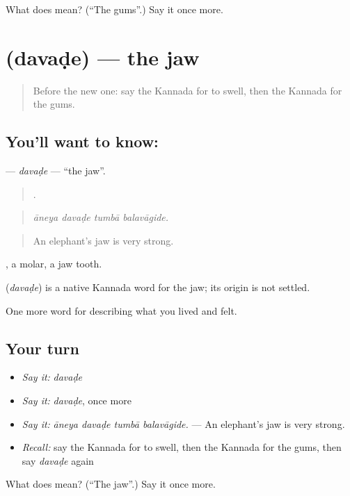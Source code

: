 \begin{tcolorbox}[breakable,colback=teal!4,colframe=teal!35!black,title={Before you move on}]
What does  mean? (\textquotedblleft{}The gums\textquotedblright{}.) Say it once more.
\end{tcolorbox}
\section[\texorpdfstring{\kn{ದವಡೆ} (davaḍe)}{ದವಡೆ (davaḍe)}]{ (davaḍe) — the jaw}

\label{lesson:KA-C510-davade}



\begin{quote}
Before the new one: say the Kannada for to swell, then the Kannada for the gums.
\end{quote}

\subsection*{You'll want to know: }
\textbf{} — \emph{davaḍe} — \textquotedblleft{}the jaw\textquotedblright{}.

\begin{quote}
   .
\end{quote}

\begin{quote}
\emph{āneya davaḍe tumbā balavāgide.}
\end{quote}

\begin{quote}
An elephant's jaw is very strong.
\end{quote}

 , a molar, a jaw tooth.

\begin{cousinweb}
\textbf{} (\emph{davaḍe}) is a native Kannada word for the jaw; its origin is not settled.
\end{cousinweb}

\begin{grammarlens}[title={What you've built}]
One more word for describing what you lived and felt.
\end{grammarlens}

\subsection*{Your turn}
\begin{itemize}
\raggedright
  \item \emph{Say it:} \emph{davaḍe}
  \item \emph{Say it:} \emph{davaḍe}, once more
  \item \emph{Say it:} \emph{āneya davaḍe tumbā balavāgide.} — An elephant's jaw is very strong.
  \item \emph{Recall:} say the Kannada for to swell, then the Kannada for the gums, then say \emph{davaḍe} again
\end{itemize}

\begin{tcolorbox}[breakable,colback=teal!4,colframe=teal!35!black,title={Before you move on}]
What does  mean? (\textquotedblleft{}The jaw\textquotedblright{}.) Say it once more.
\end{tcolorbox}
